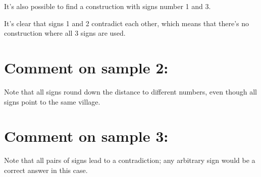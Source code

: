 It's also possible to find a construction with signs number 1 and 3.

It's clear that signs 1 and 2 contradict each other, which means that there's no construction where all 3 signs are used.

\section*{Comment on sample 2:}
Note that all signs round down the distance to different numbers, even though all signs point to the same village.

\section*{Comment on sample 3:}
Note that all pairs of signs lead to a contradiction; any arbitrary sign would be a correct answer in this case.